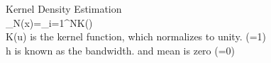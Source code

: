 
Kernel Density Estimation \\
_N(x)=\sum_{i=1}^NK\left(\right) \\
K(u) is the kernel function, which normalizes to unity. (=1) \\
h is known as the bandwidth. and mean is zero (=0) \\

